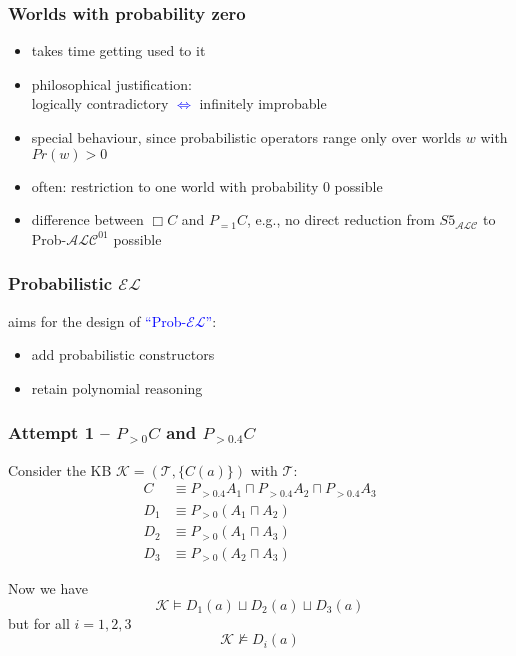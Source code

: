 \documentclass{beamer}
\newcommand{\el}{\ensuremath{\mathcal{EL}}\xspace}
\newcommand{\alc}{\ensuremath{\mathcal{ALC}}\xspace}
\newcommand{\exptime}{\ensuremath{\textsc{ExpTime}}\xspace}
\renewcommand{\emph}[1]{\textcolor{blue}{#1}}
\begin{document}
\begin{frame}
  \frametitle{Worlds with probability zero}
  \begin{itemize}
    \item takes time getting used to it
    \item philosophical justification: \\
      logically contradictory \emph{$\Longleftrightarrow$} infinitely improbable
    \item special behaviour, since probabilistic operators range only over worlds $w$ with $Pr(w)>0$
    \item often: restriction to one world with probability 0 possible
    \item difference between $\Box C$ and $P_{=1}C$, \mbox{e.g.}, no direct reduction from $S5_{\alc}$
      to Prob-$\alc^{01}$ possible
  \end{itemize}
\end{frame}


\begin{frame}
  \frametitle{Probabilistic \el}
  aims for the design of \emph{``Prob-\el''}:
  \begin{itemize}
    \item add probabilistic constructors
    \item retain polynomial reasoning
  \end{itemize}

\end{frame}

\begin{frame}
  \frametitle{Attempt 1 -- $P_{>0}C$ and $P_{>0.4}C$}

  Consider the KB $\mathcal K=(\mathcal T, \{C(a)\})$ with $\mathcal T$: 
  \begin{align*}
    C &\equiv P_{>0.4}A_1\sqcap P_{>0.4}A_2\sqcap P_{>0.4}A_3 \\
    D_1 &\equiv P_{>0}(A_1\sqcap A_2) \\
    D_2 &\equiv P_{>0}(A_1\sqcap A_3) \\
    D_3 &\equiv P_{>0}(A_2\sqcap A_3)
  \end{align*}

  \pause
  Now we have $$\mathcal K\models D_1(a)\sqcup D_2(a)\sqcup D_3(a)$$ but for all $i=1,2,3$ $$\mathcal K\not\models D_i(a)$$
\end{frame}
\end{document}
